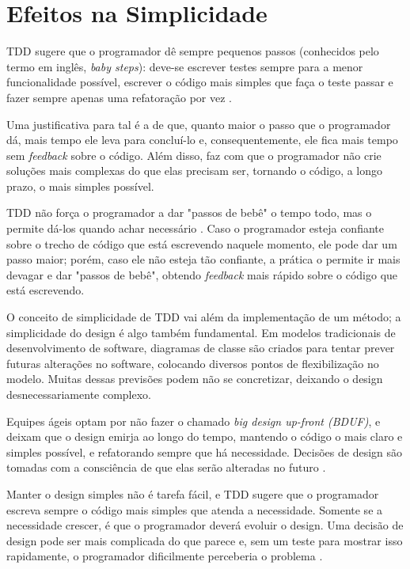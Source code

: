 \section{Efeitos na Simplicidade}

TDD sugere que o programador dê sempre pequenos passos (conhecidos pelo termo em
inglês, \textit{baby steps}): deve-se escrever testes sempre para a menor
funcionalidade possível, escrever o código mais simples que faça o teste passar
e fazer sempre apenas uma refatoração por vez \cite{TDDByExample}.

Uma justificativa para tal é a de que, quanto maior o passo que o programador dá, mais
tempo ele leva para concluí-lo e, consequentemente, ele fica mais tempo
sem \textit{feedback} sobre o código. Além disso, faz com que o programador não crie
soluções mais complexas do que elas precisam ser, tornando o código, a longo
prazo, o mais simples possível.

TDD não força o programador a dar "passos de bebê" o tempo todo, mas o
permite dá-los quando achar necessário
\cite{TDDByExample}. Caso o programador esteja confiante sobre o trecho de
código que está escrevendo naquele momento, ele pode dar um passo maior;  porém,
caso ele não esteja tão confiante, a prática o permite ir mais devagar e 
dar "passos de bebê", obtendo \textit{feedback} mais rápido sobre o código que está
escrevendo.

O conceito de simplicidade de TDD vai além da implementação de um método; a
simplicidade do design é algo também fundamental. Em modelos tradicionais de
desenvolvimento de software, diagramas de classe são criados para tentar prever
futuras alterações no software, colocando diversos pontos de flexibilização no
modelo. Muitas dessas previsões podem não se concretizar, deixando o design
desnecessariamente complexo.

Equipes ágeis optam por não fazer o chamado \textit{big design up-front (BDUF)},
e deixam que o design emirja ao longo do tempo, mantendo o código o mais claro e
simples possível, e refatorando sempre que há necessidade. Decisões de
design são tomadas com a consciência de que elas serão alteradas no futuro
\cite{is-design-dead}.

Manter o design simples não é tarefa fácil, e TDD sugere que o programador
escreva sempre o código mais simples que atenda a necessidade. Somente se a
necessidade crescer, é que o programador deverá evoluir o design. Uma decisão de
design pode ser mais complicada do que parece e, sem um teste para mostrar isso
rapidamente, o programador dificilmente perceberia o problema \cite{aim-fire}.

